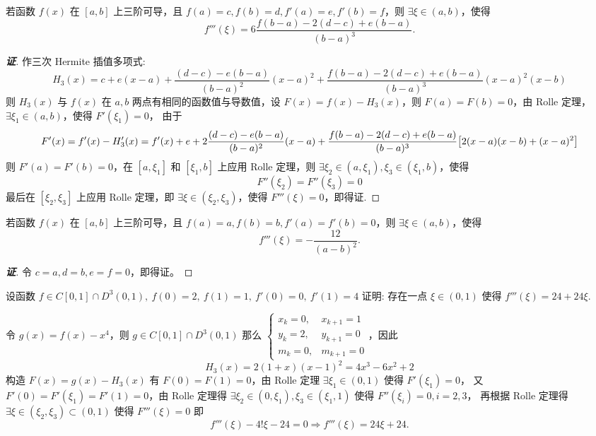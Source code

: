 \begin{theorem}
    若函数 $f(x)\text{ 在 }[a,b]$ 上三阶可导，且 $f(a)=c,f(b)=d,f'(a)=e,f'(b)=f$，则 $\exists\xi\in(a,b)$，使得 $$f'''(\xi)=6\dfrac{f(b-a)-2(d-c)+e(b-a)}{(b-a)^3}.$$
\end{theorem}
\begin{proof}[{\songti \textbf{证}}]
    作三次 Hermite 插值多项式: $$H_3(x)=c+e(x-a)+\dfrac{(d-c)-e(b-a)}{(b-a)^2}(x-a)^2+\dfrac{f(b-a)-2(d-c)+e(b-a)}{(b-a)^3}(x-a)^2(x-b)$$
    则 $H_3(x)$ 与 $f(x)$ 在 $a,b$ 两点有相同的函数值与导数值，设 $F(x)=f(x)-H_3(x)$，则 $F(a)=F(b)=0$，由 Rolle 定理，$\exists\xi_1\in(a,b)$，使得 $F'(\xi_1)=0$，
    由于 $$F'(x)=f'(x)-H_3'(x)=f'(x)+e+2\dfrac{(d-c)-e(b-a)}{(b-a)^2}(x-a)+\dfrac{f(b-a)-2(d-c)+e(b-a)}{(b-a)^3}\qty[2(x-a)(x-b)+(x-a)^2]$$
    则 $F'(a)=F'(b)=0$，在 $[a,\xi_1]$ 和 $[\xi_1,b]$ 上应用 Rolle 定理，则 $\exists\xi_2\in(a,\xi_1),\xi_3\in(\xi_1,b)$，使得 $$F''(\xi_2)=F''(\xi_3)=0$$
    最后在 $[\xi_2,\xi_3]$ 上应用 Rolle 定理，即 $\exists\xi\in(\xi_2,\xi_3)$，使得 $F'''(\xi)=0$，即得证.
\end{proof}
\begin{inference}
    若函数 $f(x)\text{ 在 }[a,b]$ 上三阶可导，且 $f(a)=a,f(b)=b,f'(a)=f'(b)=0$，则 $\exists\xi\in(a,b)$，使得 $$f'''(\xi)=-\dfrac{12}{(a-b)^2}.$$
\end{inference}
\begin{proof}[{\songti \textbf{证}}]
    令 $c=a,d=b,e=f=0$，即得证。
\end{proof}

\begin{example}
    设函数 $f\in C[0,1]\cap D^3(0,1),~f(0)=2,~f(1)=1,~f'(0)=0,~f'(1)=4$ 证明: 存在一点 $\xi\in(0,1)$ 使得 $f'''(\xi)=24+24\xi.$
\end{example}
\begin{solution}
    令 $g(x)=f(x)-x^4$，则 $g\in C[0,1]\cap D^3(0,1)$ 那么 $\begin{cases}
            x_k=0  , & x_{k+1}=1 \\
            y_k=2  , & y_{k+1}=0 \\
            m_k=0  , & m_{k+1}=0
        \end{cases}$，因此
        $$H_3(x)=2(1+x)(x-1)^2=4x^3-6x^2+2$$
        构造 $F(x)=g(x)-H_3(x)$ 有 $F(0)=F(1)=0$，由 Rolle 定理 $\exists\xi_1\in(0,1)$ 使得 $F'(\xi_1)=0$，
        又 $F'(0)=F'(\xi_1)=F'(1)=0$，由 Rolle 定理得 $\exists \xi_2\in(0,\xi_1),\xi_3\in(\xi_1,1)$ 使得 $F''(\xi_i)=0,i=2,3$，
        再根据 Rolle 定理得 $\exists\xi\in(\xi_2,\xi_3)\subset(0,1)$ 使得 $F'''(\xi)=0$ 即
        $$f'''(\xi)-4!\xi-24=0\Rightarrow f'''(\xi)=24\xi+24.$$
\end{solution}